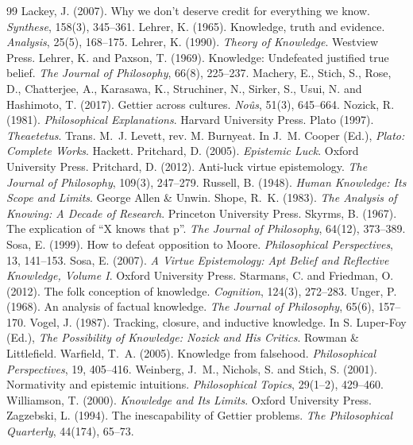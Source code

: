\documentclass{situationist-preprint}
\begin{document}
\begin{thebibliography}{99}
 Lackey, J. (2007). Why we don't deserve credit for everything we know. \emph{Synthese}, 158(3), 345--361.
 Lehrer, K. (1965). Knowledge, truth and evidence. \emph{Analysis}, 25(5), 168--175.
 Lehrer, K. (1990). \emph{Theory of Knowledge}. Westview Press.
 Lehrer, K. and Paxson, T. (1969). Knowledge: Undefeated justified true belief. \emph{The Journal of Philosophy}, 66(8), 225--237.
 Machery, E., Stich, S., Rose, D., Chatterjee, A., Karasawa, K., Struchiner, N., Sirker, S., Usui, N. and Hashimoto, T. (2017). Gettier across cultures. \emph{No\^us}, 51(3), 645--664.
 Nozick, R. (1981). \emph{Philosophical Explanations}. Harvard University Press.
 Plato (1997). \emph{Theaetetus}. Trans. M.~J. Levett, rev. M. Burnyeat. In J.~M. Cooper (Ed.), \emph{Plato: Complete Works}. Hackett.
 Pritchard, D. (2005). \emph{Epistemic Luck}. Oxford University Press.
 Pritchard, D. (2012). Anti-luck virtue epistemology. \emph{The Journal of Philosophy}, 109(3), 247--279.
 Russell, B. (1948). \emph{Human Knowledge: Its Scope and Limits}. George Allen \& Unwin.
 Shope, R.~K. (1983). \emph{The Analysis of Knowing: A Decade of Research}. Princeton University Press.
 Skyrms, B. (1967). The explication of \enquote{X knows that p}. \emph{The Journal of Philosophy}, 64(12), 373--389.
 Sosa, E. (1999). How to defeat opposition to Moore. \emph{Philosophical Perspectives}, 13, 141--153.
 Sosa, E. (2007). \emph{A Virtue Epistemology: Apt Belief and Reflective Knowledge, Volume I}. Oxford University Press.
 Starmans, C. and Friedman, O. (2012). The folk conception of knowledge. \emph{Cognition}, 124(3), 272--283.
 Unger, P. (1968). An analysis of factual knowledge. \emph{The Journal of Philosophy}, 65(6), 157--170.
 Vogel, J. (1987). Tracking, closure, and inductive knowledge. In S. Luper-Foy (Ed.), \emph{The Possibility of Knowledge: Nozick and His Critics}. Rowman \& Littlefield.
 Warfield, T.~A. (2005). Knowledge from falsehood. \emph{Philosophical Perspectives}, 19, 405--416.
 Weinberg, J.~M., Nichols, S. and Stich, S. (2001). Normativity and epistemic intuitions. \emph{Philosophical Topics}, 29(1--2), 429--460.
 Williamson, T. (2000). \emph{Knowledge and Its Limits}. Oxford University Press.
 Zagzebski, L. (1994). The inescapability of Gettier problems. \emph{The Philosophical Quarterly}, 44(174), 65--73.
\end{thebibliography}
\end{document}

